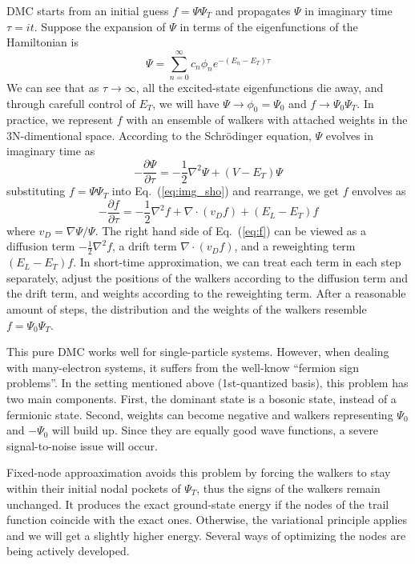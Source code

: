 \documentclass[aps,prl,reprint,groupedaddress]{revtex4-1}
\begin{document}
DMC starts from an initial guess $f = \Psi\Psi_T$ and propagates $\Psi$ in imaginary time $\tau=it$.
Suppose the expansion of $\Psi$ in terms of the eigenfunctions of the Hamiltonian is
\begin{equation}
\Psi = \sum_{n=0}^{\infty}c_n\phi_ne^{-(E_n-E_T)\tau}
\end{equation}
We can see that as $\tau\to\infty$, all the excited-state eigenfunctions die away, and through carefull control of $E_T$, we will have $\Psi\to\phi_0=\Psi_0$ and $f\to\Psi_0\Psi_T$.
In practice, we represent $f$ with an ensemble of walkers with attached weights in the 3N-dimentional space.
According to the Schrödinger equation, $\Psi$ evolves in imaginary time as
\begin{equation}
\label{eq:img_sho}
-\frac{\partial \Psi}{\partial \tau} = -\frac{1}{2}\nabla^2\Psi+(V-E_T)\Psi
\end{equation}
substituting $f=\Psi\Psi_T$ into Eq.~(\ref{eq:img_sho}) and rearrange, we get $f$ envolves as
\begin{equation}
\label{eq:f}
-\frac{\partial f}{\partial \tau} = -\frac{1}{2}\nabla^2f+\nabla\cdot(v_Df)+(E_L-E_T)f
\end{equation}
where $v_D = \nabla\Psi/\Psi$.
The right hand side of Eq.~(\ref{eq:f}) can be viewed as a diffusion term $-\frac{1}{2}\nabla^2f$, a drift term $\nabla\cdot(v_Df)$, and a reweighting term $(E_L-E_T)f$.
In short-time approximation, we can treat each term in each step separately, adjust the positions of the walkers according to the diffusion term and the drift term, and weights according to the reweighting term.
After a reasonable amount of steps, the distribution and the weights of the walkers resemble $f=\Psi_0\Psi_T$.

This pure DMC works well for single-particle systems.
However, when dealing with many-electron systems, it suffers from the well-know ``fermion sign problems''.
In the setting mentioned above (1st-quantized basis), this problem has two main components.
First, the dominant state is a bosonic state, instead of a fermionic state.
Second, weights can become negative and walkers representing $\Psi_0$ and $-\Psi_0$ will build up. Since they are equally good wave functions, a severe signal-to-noise issue will occur.

Fixed-node approaximation avoids this problem by forcing the walkers to stay within their initial nodal pockets of $\Psi_T$, thus the signs of the walkers remain unchanged.
It produces the exact ground-state energy if the nodes of the trail function coincide with the exact ones.
Otherwise, the variational principle applies and we will get a slightly higher energy.
Several ways of optimizing the nodes are being actively developed.
\end{document}
